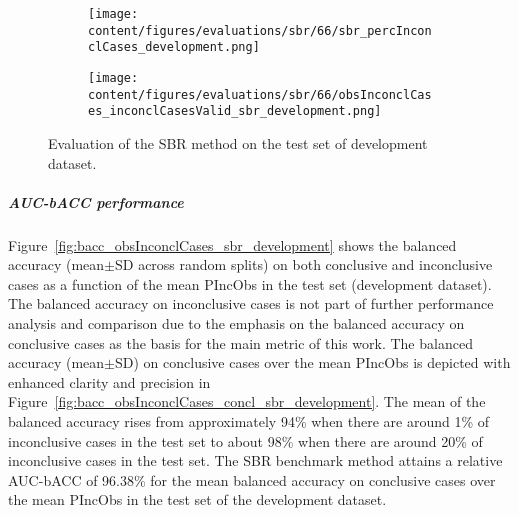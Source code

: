 \begin{figure}[ht]
  \begin{subfigure}{0.48\textwidth}
    \centering
    \texttt{[image: content/figures/evaluations/sbr/66/sbr\_percInconclCases\_development.png]}
    \label{fig:sbr_percInconclCases_development}
  \end{subfigure}
  \hfill
  \begin{subfigure}{0.495\textwidth}
    \centering
    \texttt{[image: content/figures/evaluations/sbr/66/obsInconclCases\_inconclCasesValid\_sbr\_development.png]}
    \label{fig:obsInconclCases_inconclCasesValid_sbr_development}
  \end{subfigure}

  \caption{Evaluation of the SBR method on the test set of development dataset.}
  \label{fig:}
\end{figure}

\subparagraph{AUC-bACC performance}

Figure~\ref{fig:bacc_obsInconclCases_sbr_development} shows the balanced accuracy (mean$\pm$SD across random splits) 
on both conclusive and inconclusive cases as a function of the mean PIncObs
in the test set (development dataset).
The balanced accuracy on inconclusive cases is not part of further performance analysis and comparison 
due to the emphasis on the balanced accuracy on conclusive cases as the basis for the main metric of this work.
The balanced accuracy (mean$\pm$SD) on conclusive cases over the mean PIncObs
is depicted with enhanced clarity and precision in Figure~\ref{fig:bacc_obsInconclCases_concl_sbr_development}.
The mean of the balanced accuracy rises from approximately 94\% 
when there are around 1\% of inconclusive cases in the test set to about 98\% 
when there are around 20\% of inconclusive cases in the test set.
The SBR benchmark method attains a relative AUC-bACC of 96.38\% for the mean balanced accuracy on conclusive cases
over the mean PIncObs in the test set of the development dataset.

